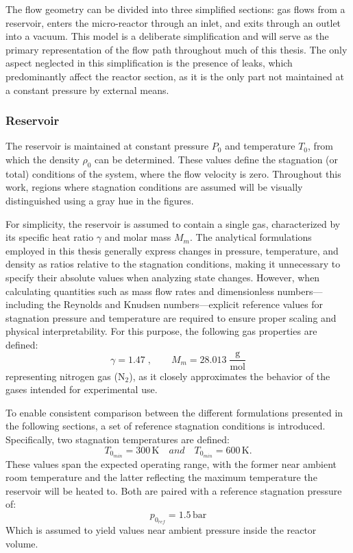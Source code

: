 
The flow geometry can be divided into three simplified sections: gas flows from a reservoir, enters the micro-reactor through an inlet, and exits through an outlet into a vacuum.
This model is a deliberate simplification and will serve as the primary representation of the flow path throughout much of this thesis.
The only aspect neglected in this simplification is the presence of leaks, which predominantly affect the reactor section, as it is the only part not maintained at a constant pressure by external means.

\subsubsection*{Reservoir}
	The reservoir is maintained at constant pressure $P_0$ and temperature $T_0$, from which the density $\rho_0$ can be determined.
	These values define the stagnation (or total) conditions of the system, where the flow velocity is zero.
	Throughout this work, regions where stagnation conditions are assumed will be visually distinguished using a gray hue in the figures.

	For simplicity, the reservoir is assumed to contain a single gas, characterized by its specific heat ratio $\gamma$ and molar mass $M_m$.
	The analytical formulations employed in this thesis generally express changes in pressure, temperature, and density as ratios relative to the stagnation conditions, making it unnecessary to specify their absolute values when analyzing state changes.
	However, when calculating quantities such as mass flow rates and dimensionless numbers—including the Reynolds and Knudsen numbers—explicit reference values for stagnation pressure and temperature are required to ensure proper scaling and physical interpretability.
	For this purpose, the following gas properties are defined:
	$$
		\gamma = 1.47\;,\qquad M_m = 28.013\; \frac{\text{g}}{\text{mol}}
	$$
	representing nitrogen gas ($\text{N}_2$), as it closely approximates the behavior of the gases intended for experimental use.

	To enable consistent comparison between the different formulations presented in the following sections, a set of reference stagnation conditions is introduced.
	Specifically, two stagnation temperatures are defined:
	$$
		T_{0_{min}} = 300\,\text{K}
			\quad and \quad
		T_{0_{min}} = 600\,\text{K}.
	$$
	These values span the expected operating range, with the former near ambient room temperature and the latter reflecting the maximum temperature the reservoir will be heated to.
	Both are paired with a reference stagnation pressure of:
	$$
		p_{0_{ref}} = 1.5\,\text{bar}
	$$
	Which is assumed to yield values near ambient pressure inside the reactor volume.

